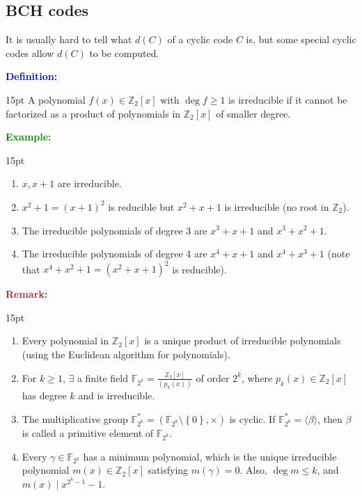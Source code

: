 \documentclass[12pt]{article}
\newcommand{\noparskip}{\vspace{-\parskip}}
\newenvironment{points}
	{\begin{enumerate}[label = (\arabic*)]}
	{\end{enumerate}}
\newenvironment{dent}
	{\begin{adjustwidth}{15pt}{}\noparskip}
	{\end{adjustwidth}}
\newenvironment{definition}
	{\textcolor{Blue}{\textbf{Definition:}}\begin{dent}}
	{\end{dent}}
\newenvironment{example}
	{\textcolor{Green}{\textbf{Example:}}\begin{dent}}
	{\end{dent}}
\newenvironment{remark}
	{\textcolor{Brown}{\textbf{Remark:}}\begin{dent}}
	{\end{dent}}
\newcommand{\set}[1]{\left\{ #1 \right\}}
\newcommand{\Z}{\mathbb{Z}}
\newcommand{\Ztwox}{\Z_2[x]}
\newcommand{\gen}[1]{\left( #1 \right)}
\newcommand{\Ztwoxgen}[1]{\frac{\Ztwox}{\gen{#1}}}
\newcommand{\field}[1]{\mathbb{F}_{#1}}
\newcommand{\cycgen}[1]{\langle #1 \rangle}
\begin{document}
\subsection{BCH codes}

It is usually hard to tell what $d(C)$ of a cyclic code $C$ is, but some special cyclic codes allow $d(C)$ to be computed.

\begin{definition}
A polynomial $f(x) \in \Ztwox$ with $\deg f \ge 1$ is irreducible if it cannot be factorized as a product of polynomials in $\Ztwox$ of smaller degree.
\end{definition}

\begin{example}
\begin{points}
\item $x, x + 1$ are irreducible.
\item $x^2 + 1 = (x + 1)^2$ is reducible but $x^2 + x + 1$ is irreducible (no root in $\Z_2$).
\item The irreducible polynomials of degree 3 are $x^3 + x + 1$ and $x^3 + x^2 + 1$.
\item The irreducible polynomials of degree 4 are $x^4 + x + 1$ and $x^4 + x^3 + 1$ (note that $x^4 + x^2 + 1 = (x^2 + x + 1)^2$ is reducible).
\end{points}
\end{example}

\begin{remark}
\begin{points}
\item Every polynomial in $\Ztwox$ is a unique product of irreducible polynomials (using the Euclidean algorithm for polynomials).
\item For $k \ge 1$, $\exists$ a finite field $\field{2^k} = \Ztwoxgen{p_k(x)}$ of order $2^k$, where $p_k(x) \in \Ztwox$ has degree $k$ and is irreducible.
\item The multiplicative group $\field{2^k}^* = (\field{2^k} \setminus \set{0}, \times)$ is cyclic. If $\field{2^k}^* = \cycgen{\beta}$, then $\beta$ is called a primitive element of $\field{2^k}$.
\item Every $\gamma \in \field{2^k}$ has a minimum polynomial, which is the unique irreducible polynomial $m(x) \in \Ztwox$ satisfying $m(\gamma) = 0$. Also, $\deg m \le k$, and $m(x) \mid x^{2^k - 1} - 1$.
\end{points}
\end{remark}
\end{document}
